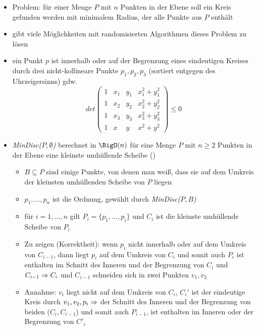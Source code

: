 \vspace*{-0.5\baselineskip}\begin{itemize}[itemsep=-1pt]
	\item Problem: für einer Menge $P$ mit $n$ Punkten in der Ebene soll ein Kreis gefunden werden mit minimalem Radius, der alle Punkte aus $P$ enthält
	\item gibt viele Möglichkeiten mit randomisierten Algorithmen dieses Problem zu lösen
	\item ein Punkt $p$ ist innerhalb oder auf der Begrenzung eines eindeutigen Kreises durch drei nicht-kollineare Punkte $p_1,p_2,p_3$ (sortiert entgegen des Uhrzeigersinns) gdw.
		\[det\left(\begin{array}{cccc}
			1 &x_1&y_1&x_1^2+y_1^2\\
			1 &x_2&y_2&x_2^2+y_2^2\\
			1 &x_3&y_3&x_3^2+y_3^2\\
			1 &x&y&x^2+y^2
		\end{array}\right)\leq 0\]
	\item \textit{MinDisc($P,\emptyset$)} berechnet in $\BigO(n)$ für eine Menge $P$ mit $n\geq 2$ Punkten in der Ebene eine kleinste umhüllende Scheibe ()
		\vspace*{-1.5\baselineskip}\Proof\up
			\begin{itemize}[itemsep=-1pt]
				\item $B\subseteq P$ sind einige Punkte, von denen man weiß, dass sie auf dem Umkreis der kleinsten umhüllenden Scheibe von $P$ liegen
				\item $p_1,\dots,p_n$ ist die Ordnung, gewählt durch \textit{MinDisc($P,B$)}
				\item für $i=1,\dots,n$ gilt $P_i=\{p_1,\dots,p_i\}$ und $C_i$ ist die kleinste umhüllende Scheibe von $P_i$
				\item Zu zeigen (Korrektheit): wenn $p_i$ nicht innerhalb oder auf dem Umkreis von $C_{i-1}$, dann liegt $p_i$ auf dem Umkreis von $C_i$ und somit auch $P_i$ ist enthalten im Schnitt des Inneren und der Begrenzung von $C_i$ und $C_{i-1}\\
				\Rightarrow C_i$ und $C_{i-1}$ schneiden sich in zwei Punkten $v_1,v_2$
				\item Annahme: $v_i$ liegt nicht auf dem Umkreis von $C_i$, $C_i'$ ist der eindeutige Kreis durch $v_1,v_2,p_i\\
				\Rightarrow$ der Schnitt des Inneren und der Begrenzung von beiden ($C_i,C_{i-1}$) und somit auch $P_{i-1}$, ist enthalten im Inneren oder der Begrenzung von $C'_i$
			\end{itemize}
\end{itemize}
